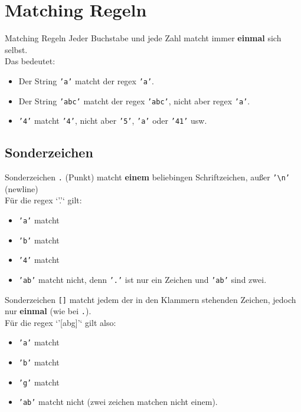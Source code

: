 \section{Matching Regeln}
\begin{frame}{Matching Regeln}
	Jeder Buchstabe und jede Zahl matcht immer \textbf{einmal} sich selbst.\\[.25cm]
	Das bedeutet:\\
	\begin{itemize}
		\item 	Der String \texttt{'a'} matcht der regex \texttt{'a'}.\\
		\item Der String \texttt{'abc'} matcht der regex \texttt{'abc'}, nicht aber regex \texttt{'a'}.\\
		\item \texttt{'4'} matcht \texttt{'4'}, nicht aber \texttt{'5'}, \texttt{'a'} oder \texttt{'41'} usw.
	\end{itemize}
\end{frame}

\subsection{Sonderzeichen}
\begin{frame}{Sonderzeichen}
	\texttt{.} (Punkt) matcht \textbf{einem} beliebingen Schriftzeichen, außer \texttt{'\textbackslash{}n'} (newline)\\[.25cm]
	Für die regex `'.'` gilt:\\
	\begin{itemize}
		\item \texttt{'a'} matcht
		\item \texttt{'b'} matcht
		\item \texttt{'4'} matcht
		\item \texttt{'ab'} matcht nicht, denn \texttt{'.'} ist nur ein Zeichen und \texttt{'ab'} sind zwei.
	\end{itemize}
\end{frame}

\begin{frame}{Sonderzeichen}
	\texttt{[]} matcht jedem der in den Klammern stehenden Zeichen, jedoch nur \textbf{einmal} (wie bei \texttt{.}).\\[.25cm]
	Für die regex `'[abg]'` gilt also:\\
	\begin{itemize}
		\item \texttt{'a'} matcht
		\item \texttt{'b'} matcht
		\item \texttt{'g'} matcht
		\item \texttt{'ab'} matcht nicht (zwei zeichen matchen nicht einem).
	\end{itemize}
\end{frame}


